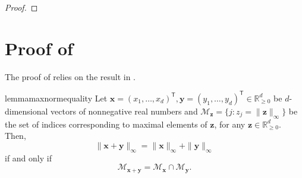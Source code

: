 \documentclass[letterpaper]{article} %
\newcommand{\R}{{\mathbb{R}}}
\newcommand{\Pm}{{\mathbb{P}}}
\newcommand{\bx}{{\bm{x}}}
\newcommand{\bz}{{\bm{z}}}
\newcommand{\by}{{\bm{y}}}
\newcommand{\T}{{\mathsf{T}}}
\newcommand{\gvn}{\,|\,}
\newcommand{\sM}{{\mathscr{M}}}
\begin{document}
\begin{proof}
\end{proof}







\section{Proof of }
\label{app:early_stopping}
The proof of  relies on the result in .

\begin{restatable}[]{lemma}{maxnormequality}
    \label{lemma:max-norm-equality} 
    Let $\bx=(x_1,\ldots,x_d)^\T,\by=(y_1,\ldots,y_d)^\T\in \R_{\geq 0}^d$ be $d$-dimensional vectors of nonnegative real numbers and 
    $\sM_{\bz}=\{j:z_j=\|\bz\|_\infty\}$ 
    be the set of indices corresponding to maximal elements of $\bz$, for any $\bz\in \R_{\geq 0}^d$. Then, 
    \[
        \|\bx+\by\|_\infty = \|\bx\|_\infty + \|\by\|_\infty
    \]
    if and only if 
    \[
        \sM_{\bx+\by} = \sM_{\bx}\cap \sM_{\by}.
    \]
\end{restatable}
\end{document}
